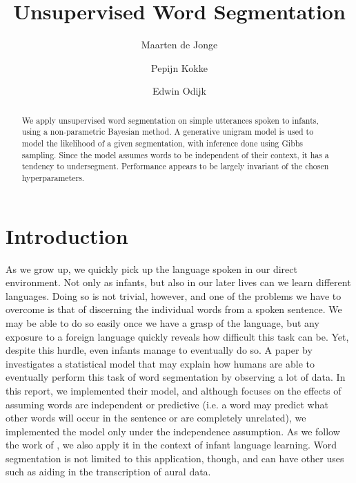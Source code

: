 \documentclass[11pt]{article}
\title{Unsupervised Word Segmentation}
\author{Maarten de Jonge \and Pepijn Kokke \and Edwin Odijk}
\date{}
\begin{document}
\maketitle

\begin{abstract}
  We apply unsupervised word segmentation on simple utterances spoken to
  infants, using a non-parametric Bayesian method. A generative unigram model is
  used to model the likelihood of a given segmentation, with inference done
  using Gibbs sampling. Since the model assumes words to be independent of their
  context, it has a tendency to undersegment. Performance appears to be largely
  invariant of the chosen hyperparameters.
\end{abstract}

\section{Introduction}
As we grow up, we quickly pick up the language spoken in our direct environment. Not only as infants, but also in our later lives can we learn different languages. Doing so is not trivial, however, and one of the problems we have to overcome is that of discerning the individual words from a spoken sentence. We may be able to do so easily once we have a grasp of the language, but any exposure to a foreign language quickly reveals how difficult this task can be. Yet, despite this hurdle, even infants manage to eventually do so. A paper by \cite{goldwater2009} investigates a statistical model that may explain how humans are able to eventually perform this task of word segmentation by observing a lot of data. In this report, we implemented their model, and although \cite{goldwater2009} focuses on the effects of assuming words are independent or predictive (i.e. a word may predict what other words will occur in the sentence or are completely unrelated), we implemented the model only under the independence assumption. As we follow the work of \cite{goldwater2009}, we also apply it in the context of infant language learning. Word segmentation is not limited to this application, though, and can have other uses such as aiding in the transcription of aural data.
\end{document}

